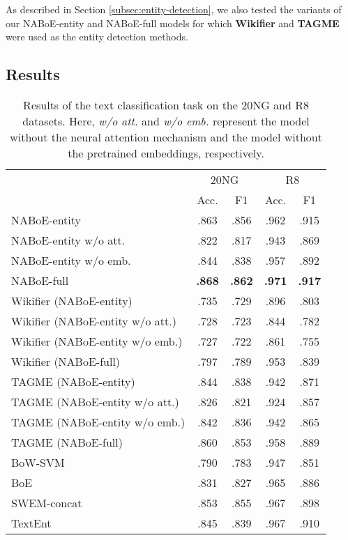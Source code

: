 \documentclass[11pt,a4paper]{article}
\begin{document}
    As described in Section \ref{subsec:entity-detection}, we also tested the variants of our NABoE-entity and NABoE-full models for which \textbf{Wikifier} and \textbf{TAGME} were used as the entity detection methods.

    \subsection{Results}

    \begin{table}[tb]
        \centering
        \setlength\tabcolsep{3pt}
        \small{
        \begin{tabular}{l|cc|cc}
            & \multicolumn{2}{|c|}{20NG} & \multicolumn{2}{c}{R8}\\
            & Acc. & F1 & Acc. & F1\\
            \hline
            NABoE-entity          & .863          & .856          & .962          & .915 \\
            NABoE-entity w/o att. & .822          & .817          & .943          & .869 \\
            NABoE-entity w/o emb. & .844          & .838          & .957          & .892 \\
            NABoE-full            & \textbf{.868} & \textbf{.862} & \textbf{.971} & \textbf{.917} \\
            \hline
            Wikifier (NABoE-entity)          & .735 & .729 & .896 & .803\\
            Wikifier (NABoE-entity w/o att.) & .728 & .723 & .844 & .782\\
            Wikifier (NABoE-entity w/o emb.) & .727 & .722 & .861 & .755\\
            Wikifier (NABoE-full)            & .797 & .789 & .953 & .839\\
            \hline
            TAGME (NABoE-entity)          & .844 & .838 & .942 & .871\\ TAGME (NABoE-entity w/o att.) & .826 & .821 & .924 & .857\\ TAGME (NABoE-entity w/o emb.) & .842 & .836 & .942 & .865\\ TAGME (NABoE-full)            & .860 & .853 & .958 & .889\\
            \hline
            BoW-SVM     & .790 & .783 & .947 & .851 \\
            BoE         & .831 & .827 & .965 & .886 \\
            SWEM-concat & .853 & .855 & .967 & .898 \\
            TextEnt     & .845 & .839 & .967 & .910 \\
        \end{tabular}
        }
        \caption{Results of the text classification task on the 20NG and R8 datasets.
            Here, \textit{w/o att.} and \textit{w/o emb.} represent the model without the neural attention mechanism and the model without the pretrained embeddings, respectively.}
        \label{tb:main-results}
    \end{table}
\end{document}
